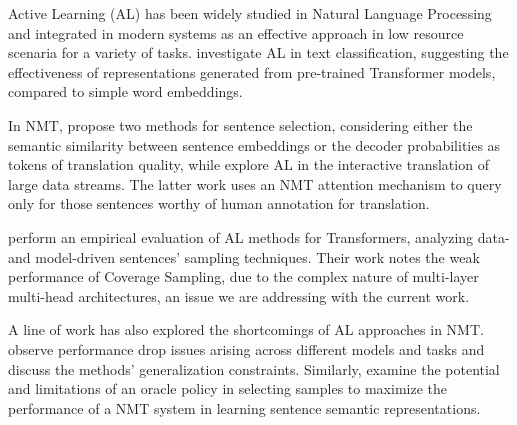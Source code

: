 Active Learning (AL) has been widely studied in Natural Language Processing and integrated in modern systems as an effective approach in low resource scenaria for a variety of tasks. 
\citet{lu2020investigating} investigate AL in text classification, suggesting the effectiveness of representations generated from pre-trained Transformer models, compared to simple word embeddings.

In NMT, \citet{zhang2018active} propose two methods for sentence selection, considering either the semantic similarity between sentence embeddings or the decoder probabilities as tokens of translation quality, while \citet{peris2020active} explore AL in the interactive translation of large data streams. The latter work uses an NMT attention mechanism to query only for those sentences worthy of human annotation for translation. 

\citet{zeng2019empirical} perform an empirical evaluation of AL methods for Transformers, analyzing data- and model-driven sentences' sampling techniques. Their work notes the weak performance of Coverage Sampling, due to the complex nature of multi-layer multi-head architectures, an issue we are addressing with the current work.

A line of work has also explored the shortcomings of AL approaches in NMT. \citet{lowell2018practical} observe performance drop issues arising across different models and tasks and discuss the methods' generalization constraints. Similarly, \citet{koshorek2019limits} examine the potential and limitations of an oracle policy in selecting samples to maximize the performance of a NMT system in learning sentence semantic representations.


